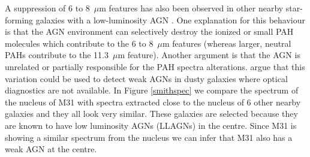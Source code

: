 A suppression of 6 to 8~$\mu$m features has also been observed in other nearby star-forming galaxies with a low-luminosity AGN \citep{Smith:2007lr}. 
One explanation for this behaviour is that the AGN environment can selectively destroy the ionized or small PAH molecules which contribute to the 6 to 8~$\mu$m 
features (whereas larger, neutral PAHs contribute to the 11.3~$\mu$m feature). Another argument is that the AGN is unrelated or partially responsible for the PAH spectra alterations. \citet{Smith:2007lr} argue that this variation could be used to detect weak AGNs in dusty galaxies where optical diagnostics are not available. 
In Figure \ref{smithspec} we compare the spectrum of the nucleus of M31 with spectra extracted close to the nucleus of 6 other nearby galaxies and they 
all look very similar. These galaxies are selected because they are known to have low luminosity AGNs (LLAGNs) in the centre. Since M31 is showing a similar spectrum from the 
nucleus we can infer that  M31 also has a weak AGN at the centre.

%
%

